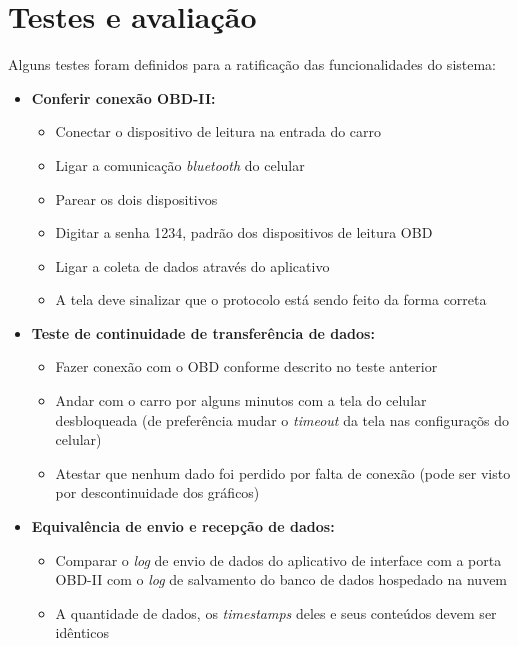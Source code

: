 \section{Testes e avaliação}
Alguns testes foram definidos para a ratificação das funcionalidades do sistema:

\begin{itemize}
    \item \textbf{Conferir conexão OBD-II:} 
    
    \begin{itemize}
        \item Conectar o dispositivo de leitura na entrada do carro
        \item Ligar a comunicação \textit{bluetooth} do celular
        \item Parear os dois dispositivos
        \item Digitar a senha 1234, padrão dos dispositivos de leitura OBD
        \item Ligar a coleta de dados através do aplicativo
        \item A tela deve sinalizar que o protocolo está sendo feito da forma correta
    \end{itemize}
    
    \item \textbf{Teste de continuidade de transferência de dados:} 
    \begin{itemize}
        \item Fazer conexão com o OBD conforme descrito no teste anterior
        \item Andar com o carro por alguns minutos com a tela do celular desbloqueada (de preferência mudar o \textit{timeout} da tela nas configuraçõs do celular)
        \item Atestar que nenhum dado foi perdido por falta de conexão (pode ser visto por descontinuidade dos gráficos)
    \end{itemize}
    
    \item \textbf{Equivalência de envio e recepção de dados:}
    \begin{itemize}
        \item Comparar o \textit{log} de envio de dados do aplicativo de interface com a porta OBD-II com o \textit{log} de salvamento do banco de dados hospedado na nuvem
        \item A quantidade de dados, os \textit{timestamps} deles e seus conteúdos devem ser idênticos
    \end{itemize}
    

\end{itemize}
